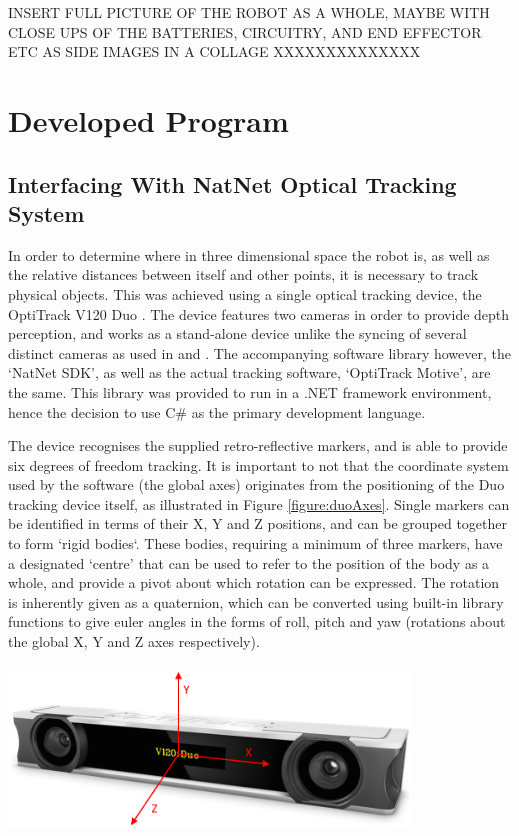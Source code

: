 \documentclass[11pt]{article}
\begin{document}
INSERT FULL PICTURE OF THE ROBOT AS A WHOLE, MAYBE WITH CLOSE UPS OF THE BATTERIES, CIRCUITRY, AND END EFFECTOR ETC AS SIDE IMAGES IN A COLLAGE XXXXXXXXXXXXXX

\pagebreak
\section{Developed Program}

\subsection{Interfacing With NatNet Optical Tracking System}
\label{section:natnet}
In order to determine where in three dimensional space the robot is, as well as the relative distances between itself and other points, it is necessary to track physical objects. This was achieved using a single optical tracking device, the OptiTrack V120 Duo \cite{OptiTrackSite}. The device features two cameras in order to provide depth perception, and works as a stand-alone device unlike the syncing of several distinct cameras as used in \cite{GreggSmithDesign} and \cite{GreggSmithFeedback}. The accompanying software library however, the `NatNet SDK', as well as the actual tracking software, `OptiTrack Motive', are the same. This library was provided to run in a .NET framework environment, hence the decision to use C\# as the primary development language.

The device recognises the supplied retro-reflective markers, and is able to provide six degrees of freedom tracking. It is important to not that the coordinate system used by the software (the global axes) originates from the positioning of the Duo tracking device itself, as illustrated in Figure \ref{figure:duoAxes}. Single markers can be identified in terms of their X, Y and Z positions, and can be grouped together to form `rigid bodies`. These bodies, requiring a minimum of three markers, have a designated `centre' that can be used to refer to the position of the body as a whole, and provide a pivot about which rotation can be expressed. The rotation is inherently given as a quaternion, which can be converted using built-in library functions to give euler angles in the forms of roll, pitch and yaw (rotations about the global X, Y and Z axes respectively).


\begin{center}
\includegraphics[width=0.8\textwidth]{images/duoAxes.png}
\label{figure:duoAxes}
\end{center}
\end{document}
